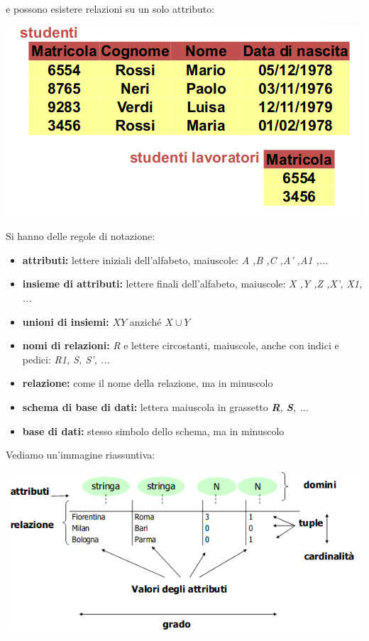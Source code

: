 \documentclass[a4paper,12pt, oneside]{book}
\begin{document}
e possono esistere relazioni su  un solo attributo:
\begin{center}
	\includegraphics[scale=0.7]{img/rel7.png}
\end{center}
\newpage
Si hanno delle regole di notazione:
\begin{itemize}
	\item \textbf{attributi:} lettere iniziali dell'alfabeto, maiuscole: \textit{A ,B ,C ,A’ ,A1 ,... }
	\item \textbf{insieme di attributi:} lettere finali dell'alfabeto, maiuscole: \textit{X ,Y ,Z ,X’, X1, ...}
	\item \textbf{unioni di insiemi:} $XY$ anziché $X\cup Y$
	\item \textbf{nomi di relazioni:} \textit{R }e lettere circostanti, maiuscole, anche con indici e pedici: \textit{R1, S, S’, ...}
	\item \textbf{relazione:} come il nome della relazione, ma in minuscolo
	\item \textbf{schema di base di dati:} lettera maiuscola in grassetto \textit{\textbf{R}, \textbf{S}, ...}
	\item \textbf{base di dati:} stesso simbolo dello schema, ma in minuscolo
\end{itemize}
Vediamo un'immagine riassuntiva:
\begin{center}
	\includegraphics[scale=0.7]{img/ria.png}
\end{center}
\end{document}
